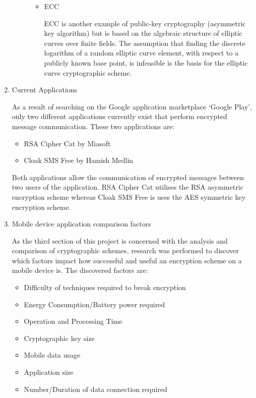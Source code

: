 \documentclass[a4paper,11pt]{article}
\begin{document}
\begin{enumerate}
\begin{description}
\begin{itemize}
      \item
      \begin{description}
        \item[ECC] 
      \end{description}
      ECC is another example of public-key cryptography (asymmetric key algorithm) but is based on the algebraic structure of elliptic curves over finite fields. The assumption that finding the discrete logarithm of a random elliptic curve element, with respect to a publicly known base point, is infeasible is the basis for the elliptic curve cryptographic scheme.
    \end{itemize}
  \end{description}
  \item
  \begin{description}
    \item[Current Applications] 
  \end{description}
  As a result of searching on the Google application marketplace ‘Google Play’, only two different applications currently exist that perform encrypted message communication. These two applications are:
  \begin{itemize}
    \item RSA Cipher Cat by Miasoft
    \item Cloak SMS Free by Hamish Medlin
  \end{itemize}
  Both applications allow the communication of encrypted messages between two users of the application. RSA Cipher Cat utilises the RSA asymmetric encryption scheme whereas Cloak SMS Free is uses the AES symmetric key encryption scheme.
  \item
  \begin{description}
    \item[Mobile device application comparison factors] 
  \end{description}
  As the third section of this project is concerned with the analysis and comparison of cryptographic schemes, research was performed to discover which factors impact how successful and useful an encryption scheme on a mobile device is. The discovered factors are:
  \begin{itemize}
    \item Difficulty of techniques required to break encryption
    \item Energy Consumption/Battery power required
    \item Operation and Processing Time
    \item Cryptographic key size
    \item Mobile data usage
    \item Application size
    \item Number/Duration of data connection required
  \end{itemize}
\end{enumerate}
\end{document}
